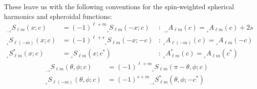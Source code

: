 \documentclass[11pt]{article}
\newcommand{\swSH}[5][]{{}_{{}_{#2}}S^{#1}_{#3}(#4;#5)}
\newcommand{\swS}[5][]{{}_{{}_{#2}}S^{#1}_{#3}(#4;#5)}
\newcommand{\scA}[4][]{{}_{{}_{#2}}A^{#1}_{#3}(#4)}
\begin{document}
\noindent
These leave us with the following conventions for the spin-weighted spherical harmonics and spheroidal functions:
\begin{align}
\swS{-s}{\ell{m}}{x}{c} &= (-1)^{\ell+m}\swS{s}{\ell{m}}{-x}{c} 
           &:\ \scA{-s}{\ell{m}}{c} = \scA{s}{\ell{m}}{c} + 2s \\
\swS{s}{\ell(-m)}{x}{c} &= (-1)^{\ell+s}\swS{s}{\ell{m}}{-x}{-c} 
           &:\ \scA{s}{\ell(-m)}{c} = \scA{s}{\ell{m}}{-c} \\
\swS[*]{s}{\ell{m}}{x}{c} &= \swS{s}{\ell{m}}{x}{c^*} 
           &:\ \scA[*]{s}{\ell{m}}{c} = \scA{s}{\ell{m}}{c^*}
\end{align}
\begin{align}\label{eqn:swSHminuss}
\swSH{-s}{\ell{m}}{\theta,\phi}{c} &= (-1)^{\ell+m}\swSH{s}{\ell{m}}{\pi-\theta,\phi}{c} \\ \label{eqn:swSHminusm}
\swSH{s}{\ell(-m)}{\theta,\phi}{c} &= (-1)^{s+m}\swSH[*]{-s}{\ell{m}}{\theta,\phi}{-c^*}
\end{align}

\newpage
{}
\vspace{0.25in}
\end{document}
